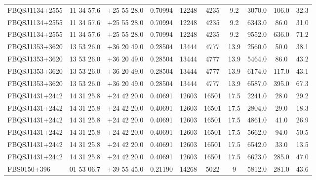 \begin{landscape}
\begin{center}
\begin{longtable}{l c c c c c c c c c}
FBQSJ1134+2555  &          11 34 57.6  &         $+$25 55 28.0  &       0.70994  & 12248  &   4235  &       9.2  &       3070.0  &  106.0  &  32.3  \\
FBQSJ1134+2555  &          11 34 57.6  &         $+$25 55 28.0  &       0.70994  & 12248  &   4235  &       9.2  &       6343.0  &  86.0  &   31.0  \\
FBQSJ1134+2555  &          11 34 57.6  &         $+$25 55 28.0  &       0.70994  & 12248  &   4235  &       9.2  &       9552.0  &  636.0  &  71.2  \\
FBQSJ1353+3620  &          13 53 26.0  &         $+$36 20 49.0  &       0.28504  & 13444  &   4777  &       13.9  &      2560.0  &  50.0  &   38.1  \\
FBQSJ1353+3620  &          13 53 26.0  &         $+$36 20 49.0  &       0.28504  & 13444  &   4777  &       13.9  &      5464.0  &  86.0  &   43.2  \\
FBQSJ1353+3620  &          13 53 26.0  &         $+$36 20 49.0  &       0.28504  & 13444  &   4777  &       13.9  &      6174.0  &  117.0  &  43.1  \\
FBQSJ1353+3620  &          13 53 26.0  &         $+$36 20 49.0  &       0.28504  & 13444  &   4777  &       13.9  &      6587.0  &  395.0  &  67.3  \\
FBQSJ1431+2442  &          14 31 25.8  &         $+$24 42 20.0  &       0.40691  & 12603  &   16501  &      17.5  &      2241.0  &  28.0  &   29.2  \\
FBQSJ1431+2442  &          14 31 25.8  &         $+$24 42 20.0  &       0.40691  & 12603  &   16501  &      17.5  &      2804.0  &  29.0  &   18.3  \\
FBQSJ1431+2442  &          14 31 25.8  &         $+$24 42 20.0  &       0.40691  & 12603  &   16501  &      17.5  &      4861.0  &  41.0  &   26.9  \\
FBQSJ1431+2442  &          14 31 25.8  &         $+$24 42 20.0  &       0.40691  & 12603  &   16501  &      17.5  &      5662.0  &  94.0  &   50.5  \\
FBQSJ1431+2442  &          14 31 25.8  &         $+$24 42 20.0  &       0.40691  & 12603  &   16501  &      17.5  &      6542.0  &  33.0  &   13.5  \\
FBQSJ1431+2442  &          14 31 25.8  &         $+$24 42 20.0  &       0.40691  & 12603  &   16501  &      17.5  &      6623.0  &  285.0  &  47.0  \\
FBS0150+396  &             01 53 06.7  &         $+$39 55 45.0  &       0.21190  & 14268  &   5022  &       9  &         5812.0  &  281.0  &  43.6  \\

\end{longtable}
\end{center}
\end{landscape}
